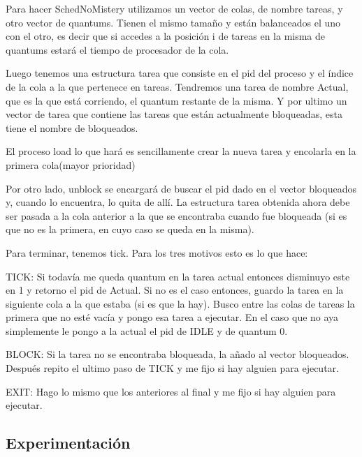 Para hacer SchedNoMistery utilizamos un vector de colas, de nombre tareas, y otro vector de quantums. Tienen el mismo tamaño y están balanceados el uno con el otro, es decir que si accedes a la posición i de tareas en la misma de quantums estará el tiempo de procesador de la cola. 

Luego tenemos una estructura tarea que consiste en el pid del proceso y el índice de la cola a la que pertenece en tareas. Tendremos una tarea de nombre Actual, que es la que está corriendo, el quantum restante de la misma. Y por ultimo un vector de tarea que contiene las tareas que están actualmente bloqueadas, esta tiene el nombre de bloqueados.

El proceso load lo que hará es sencillamente crear la nueva tarea y encolarla en la primera cola(mayor prioridad)

Por otro lado, unblock se encargará de buscar el pid dado en el vector bloqueados y, cuando lo encuentra, lo quita de allí. La estructura tarea obtenida ahora debe ser pasada a la cola anterior a la que se encontraba cuando fue bloqueada (si es que no es la primera, en cuyo caso se queda en la misma).

Para terminar, tenemos tick. Para los tres motivos esto es lo que hace:

TICK: Si todavía me queda quantum en la tarea actual entonces disminuyo este en 1 y retorno el pid de Actual. Si no es el caso entonces, guardo la tarea en la siguiente cola a la que estaba (si es que la hay). Busco entre las colas de tareas la primera que no esté vacía y pongo esa tarea a ejecutar. En el caso que no aya simplemente le pongo a la actual el pid de IDLE y de quantum 0.

 BLOCK: Si la tarea no se encontraba bloqueada, la añado al vector bloqueados. Después repito el ultimo paso de TICK y me fijo si hay alguien para ejecutar.

EXIT: Hago lo mismo que los anteriores al final y me fijo si hay alguien para ejecutar.



\subsection{Experimentación}

